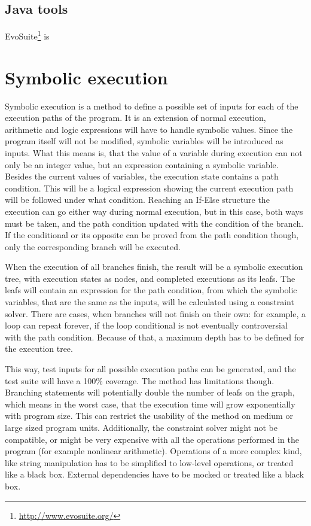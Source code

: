 \subsection{Java tools}
EvoSuite\footnote{\url{http://www.evosuite.org/}} is  \cite{aron_autom}
\section{Symbolic execution}

Symbolic execution is a method to define a possible set of inputs for each of the execution paths of the program. It is an extension of normal execution, arithmetic and logic expressions will have to handle symbolic values. Since the program itself will not be modified, symbolic variables will be introduced as inputs. What this means is, that the value of a variable during execution can not only be an integer value, but an expression containing a symbolic variable.
Besides the current values of variables, the execution state contains a path condition. This will be a logical expression showing the current execution path will be followed under what condition. Reaching an If-Else structure the execution can go either way during normal execution, but in this case, both ways must be taken, and the path condition updated with the condition of the branch. If the conditional or its opposite can be proved from the path condition though, only the corresponding branch will be executed. \cite{King:1976:SEP:360248.360252}

When the execution of all branches finish, the result will be a symbolic execution tree, with execution states as nodes, and completed executions as its leafs. The leafs will contain an expression for the path condition, from which the symbolic variables, that are the same as the inputs, will be calculated using a constraint solver. There are cases, when branches will not finish on their own: for example, a loop can repeat forever, if the loop conditional is not eventually controversial with the path condition. Because of that, a maximum depth has to be defined for the execution tree.

This way, test inputs for all possible execution paths can be generated, and the test suite will have a 100\% coverage. The method has limitations though. Branching statements will potentially double the number of leafs on the graph, which means in the worst case, that the execution time will grow exponentially with program size. This can restrict the usability of the method on medium or large sized program units. Additionally, the constraint solver might not be compatible, or might be very expensive with all the operations performed in the program (for example nonlinear arithmetic). \cite{z3_tutorial} Operations of a more complex kind, like string manipulation has to be simplified to low-level operations, or treated like a black box. External dependencies have to be mocked or treated like a black box.

